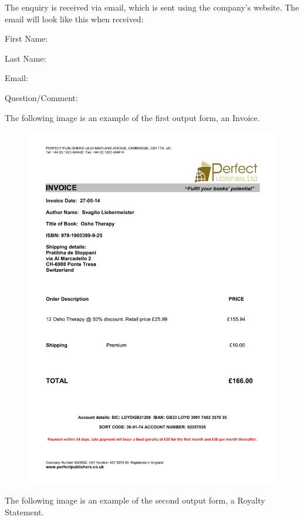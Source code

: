 The enquiry is received via email, which is sent using the company's website. The email will look like this when received:


First Name:

Last Name:

Email:

Question/Comment:



The following image is an example of the first output form, an Invoice.

\begin{figure}[H]
    \includegraphics[width=\textwidth]{./Analysis/Invoice Example.pdf}
\end{figure}


The following image is an example of the second output form, a Royalty Statement.

